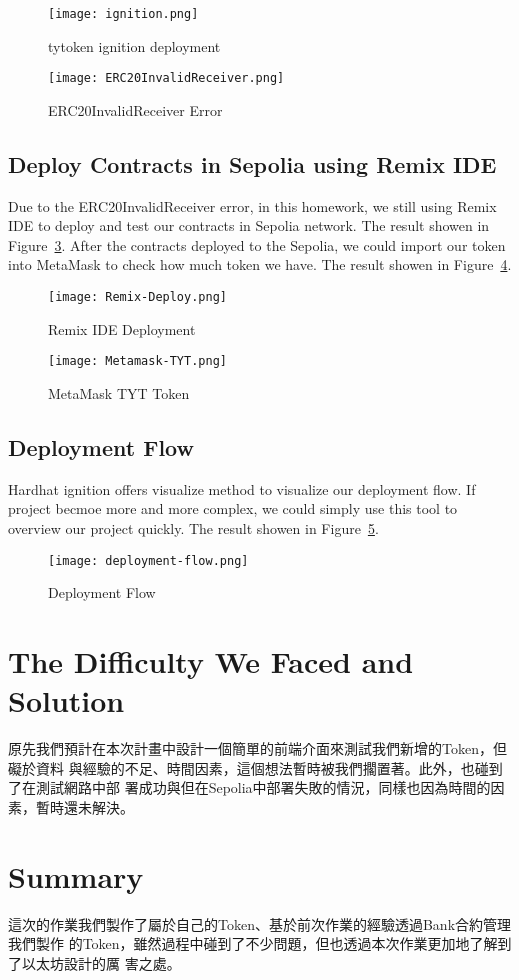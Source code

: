 \begin{figure}[h]
    \centering
    \texttt{[image: ignition.png]}
    \caption{tytoken ignition deployment}
    \label{fig:ignition}
\end{figure}

\begin{figure}[h]
    \centering
    \texttt{[image: ERC20InvalidReceiver.png]}
    \caption{ERC20InvalidReceiver Error}
    \label{fig:erc20-error}
\end{figure}

\subsection{Deploy Contracts in Sepolia using Remix IDE}

Due to the ERC20InvalidReceiver error, in this homework, we still using Remix
IDE to deploy and test our contracts in Sepolia network. The result showen in
Figure~\ref{fig:remix-deploy}. After the contracts deployed to the Sepolia, we
could import our token into MetaMask to check how much token we have. The
result showen in Figure~\ref{fig:metamask-tyt}.

\begin{figure}[H]
    \centering
    \texttt{[image: Remix-Deploy.png]}
    \caption{Remix IDE Deployment}
    \label{fig:remix-deploy}
\end{figure}

\begin{figure}[H]
    \centering
    \texttt{[image: Metamask-TYT.png]}
    \caption{MetaMask TYT Token}
    \label{fig:metamask-tyt}
\end{figure}

\subsection{Deployment Flow}

Hardhat ignition offers visualize method to visualize our deployment flow. If
project becmoe more and more complex, we could simply use this tool to overview
our project quickly. The result showen in Figure~\ref{fig:deploy-flow}.

\begin{figure}[H]
    \centering
    \texttt{[image: deployment-flow.png]}
    \caption{Deployment Flow}
    \label{fig:deploy-flow}
\end{figure}


\section{The Difficulty We Faced and Solution}

原先我們預計在本次計畫中設計一個簡單的前端介面來測試我們新增的Token，但礙於資料
與經驗的不足、時間因素，這個想法暫時被我們擱置著。此外，也碰到了在測試網路中部
署成功與但在Sepolia中部署失敗的情況，同樣也因為時間的因素，暫時還未解決。

\section{Summary}

這次的作業我們製作了屬於自己的Token、基於前次作業的經驗透過Bank合約管理我們製作
的Token，雖然過程中碰到了不少問題，但也透過本次作業更加地了解到了以太坊設計的厲
害之處。

